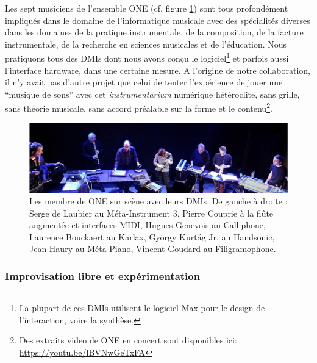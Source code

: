 \noindent Les sept musiciens de l'ensemble ONE (cf. figure \ref{fig:notation:one-fullband}) sont tous profondément impliqués dans le domaine de l'informatique musicale avec des spécialités diverses dans les domaines de la pratique instrumentale, de la composition, de la facture instrumentale, de la recherche en sciences musicales et de l'éducation. Nous pratiquons tous des \glspl{DMI} dont nous avons conçu le logiciel\footnote{La plupart de ces \glspl{DMI} utilisent le logiciel Max pour le design de l'interaction, voire la synthèse.} et parfois aussi l'interface hardware, dans une certaine mesure.
A l'origine de notre collaboration, il n'y avait pas d'autre projet que celui de tenter l'expérience de jouer une ``musique de sons'' avec cet \textit{instrumentarium} numérique hétéroclite, sans grille, sans théorie musicale, sans accord préalable sur la forme et le contenu\footnote{Des extraits video de ONE en concert sont disponibles ici: \url{https://youtu.be/lBVNwGeTxFA}}.
\begin{figure}[!htbp]
	\captionsetup{format=plain}%
	\includegraphics[width=\textwidth]{gfx/notation/ONE-fullBand.png}
	\caption[Les membres de ONE et leurs DMIs]{Les membre de ONE sur scène avec leurs \glspl{DMI}. De gauche à droite : Serge de Laubier au Méta-Instrument 3, Pierre Couprie à la flûte augmentée et interfaces MIDI, Hugues Genevois au Calliphone, Laurence Bouckaert au Karlax, György Kurtág Jr. au Handsonic, Jean Haury au Méta-Piano, Vincent Goudard au Filigramophone.}
	\label{fig:notation:one-fullband}
\end{figure}

\subsubsection{Improvisation libre et expérimentation}

